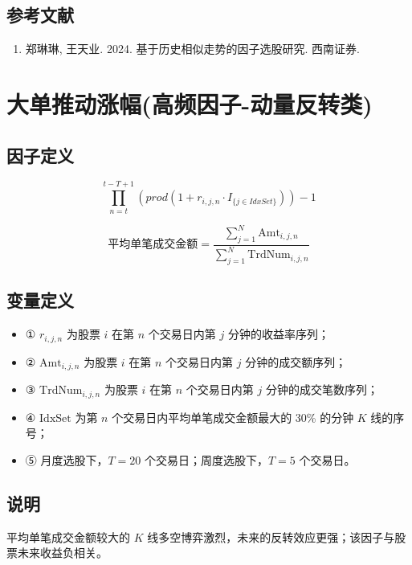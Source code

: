 \documentclass{article}
\begin{document}
\subsection{参考文献}
\begin{enumerate}
    \item 郑琳琳, 王天业. 2024. 基于历史相似走势的因子选股研究. 西南证券.
\end{enumerate}

\section{大单推动涨幅(高频因子-动量反转类)}

\subsection{因子定义}


\begin{equation}
    \prod_{n=t}^{t-T+1} \left( prod\left( 1 + r_{i,j,n} \cdot I_{\{j\in IdxSet\}}\right) \right) - 1
\end{equation}

\begin{equation}
    \text{平均单笔成交金额} = \frac{\sum_{j=1}^{N} \mathrm{Amt}_{i,j,n}}{\sum_{j=1}^{N} \mathrm{TrdNum}_{i,j,n}}
\end{equation}

\subsection{变量定义}
\begin{itemize}
    \item ① \( r_{i,j,n} \) 为股票 \( i \) 在第 \( n \) 个交易日内第 \( j \) 分钟的收益率序列；
    \item ② \( \mathrm{Amt}_{i,j,n} \) 为股票 \( i \) 在第 \( n \) 个交易日内第 \( j \) 分钟的成交额序列；
    \item ③ \( \mathrm{TrdNum}_{i,j,n} \) 为股票 \( i \) 在第 \( n \) 个交易日内第 \( j \) 分钟的成交笔数序列；
    \item ④ \( \mathrm{IdxSet} \) 为第 \( n \) 个交易日内平均单笔成交金额最大的 30\% 的分钟 \( K \) 线的序号；
    \item ⑤ 月度选股下，\( T=20 \) 个交易日；周度选股下，\( T=5 \) 个交易日。
\end{itemize}

\subsection{说明}
平均单笔成交金额较大的 \( K \) 线多空博弈激烈，未来的反转效应更强；该因子与股票未来收益负相关。
\end{document}
